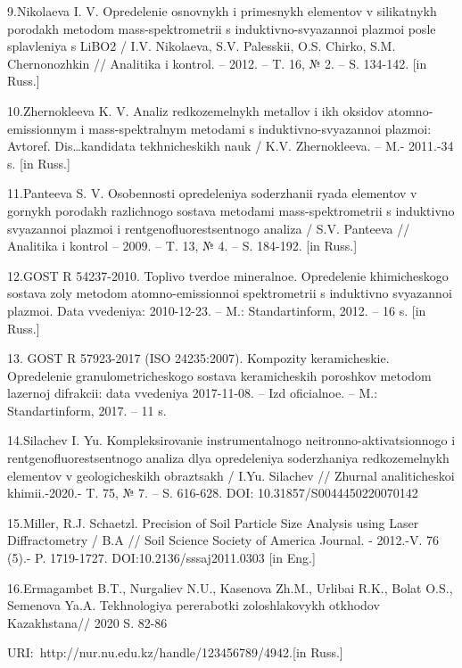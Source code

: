 9.Nikolaeva I. V. Opredelenie osnovnykh i primesnykh elementov v
silikatnykh porodakh metodom mass-spektrometrii s induktivno-svyazannoi
plazmoi posle splavleniya s LiBO2 / I.V. Nikolaeva, S.V. Palesskii, O.S.
Chirko, S.M. Chernonozhkin // Analitika i kontrol\textquotesingle. --
2012. -- T. 16, № 2. -- S. 134-142. {[}in Russ.{]}

10.Zhernokleeva K. V. Analiz redkozemel\textquotesingle nykh metallov i
ikh oksidov atomno-emissionnym i mass-spektral\textquotesingle nym
metodami s induktivno-svyazannoi plazmoi: Avtoref. Dis\ldots kandidata
tekhnicheskikh nauk / K.V. Zhernokleeva. -- M.- 2011.-34 s. {[}in
Russ.{]}

11.Panteeva S. V. Osobennosti opredeleniya soderzhanii ryada elementov v
gornykh porodakh razlichnogo sostava metodami mass-spektrometrii s
induktivno svyazannoi plazmoi i rentgenofluorestsentnogo analiza / S.V.
Panteeva // Analitika i kontrol\textquotesingle{} -- 2009. -- T. 13, №
4. -- S. 184-192. {[}in Russ.{]}

12.GOST R 54237-2010. Toplivo tverdoe mineral\textquotesingle noe.
Opredelenie khimicheskogo sostava zoly metodom atomno-emissionnoi
spektrometrii s induktivno svyazannoi plazmoi. Data vvedeniya:
2010-12-23. -- M.: Standartinform, 2012. -- 16 s. {[}in Russ.{]}

13. GOST R 57923-2017 (ISO 24235:2007). Kompozity keramicheskie.
Opredelenie granulometricheskogo sostava keramicheskih poroshkov metodom
lazernoj difrakcii: data vvedeniya 2017-11-08. -- Izd
oficial\textquotesingle noe. -- M.: Standartinform, 2017. -- 11 s.

14.Silachev I. Yu. Kompleksirovanie instrumental\textquotesingle nogo
neitronno-aktivatsionnogo i rentgenofluorestsentnogo analiza dlya
opredeleniya soderzhaniya redkozemel\textquotesingle nykh elementov v
geologicheskikh obraztsakh / I.Yu. Silachev // Zhurnal analiticheskoi
khimii.-2020.- T. 75, № 7. -- S. 616-628. DOI:
10.31857/S0044450220070142

15.Miller, R.J. Schaetzl. Precision of Soil Particle Size Analysis using
Laser Diffractometry / B.A // Soil Science Society of America Journal. -
2012.-V. 76 (5).- P. 1719-1727. DOI:10.2136/sssaj2011.0303 {[}in Eng.{]}

16.Ermagambet B.T., Nurgaliev N.U., Kasenova Zh.M., Urlibai R.K., Bolat
O.S., Semenova Ya.A. Tekhnologiya pererabotki zoloshlakovykh otkhodov
Kazakhstana// 2020 S. 82-86

URI:~http://nur.nu.edu.kz/handle/123456789/4942.{[}in Russ.{]}


